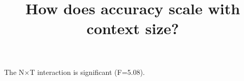 \documentclass{article}
\begin{document}
\title{How does accuracy scale with context size?}
\maketitle
The N$\times$T interaction is significant (F=5.08).
\badcommand
\end{document}
